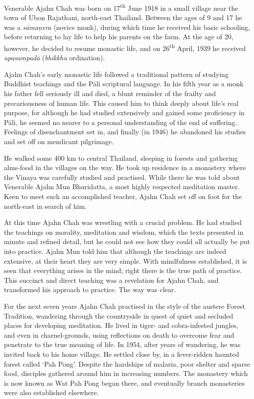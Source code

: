 
Venerable Ajahn Chah was born on 17\textsuperscript{th} June 1918 in a small village near
the town of Ubon Rajathani, north-east Thailand. Between the ages of 9
and 17 he was a \emph{sāmaṇera} (novice monk), during which time he
received his basic schooling, before returning to lay life to help his
parents on the farm. At the age of 20, however, he decided to resume
monastic life, and on 26\textsuperscript{th} April, 1939 he received \emph{upasampadā}
(\emph{bhikkhu} ordination).

Ajahn Chah's early monastic life followed a traditional pattern of
studying Buddhist teachings and the Pāli scriptural language. In his
fifth year as a monk his father fell seriously ill and died, a blunt reminder of
the frailty and precariousness of human life. This caused him to think
deeply about life's real purpose, for although he had studied
extensively and gained some proficiency in Pāli, he seemed no nearer to
a personal understanding of the end of suffering. Feelings of
disenchantment set in, and finally (in 1946) he abandoned his studies
and set off on mendicant pilgrimage. 

He walked some 400 km to central Thailand, sleeping in forests and
gathering alms-food in the villages on the way. He took up residence in a
monastery where the Vinaya was carefully studied and practised. While
there he was told about Venerable Ajahn Mun Bhuridatta, a most highly
respected meditation master. Keen to meet such an accomplished teacher, 
Ajahn Chah set off on foot for the north-east in search of him. 

At this time Ajahn Chah was wrestling with a crucial problem. He had
studied the teachings on morality, meditation and wisdom, which the
texts presented in minute and refined detail, but he could not see how
they could all actually be put into practice. Ajahn Mun told him that
although the teachings are indeed extensive, at their heart they are
very simple. With mindfulness established, it is seen that everything
arises in the mind; right there is the true path of practice. This
succinct and direct teaching was a revelation for Ajahn Chah, and
transformed his approach to practice. The way was clear. 

For the next seven years Ajahn Chah practised in the style of the
austere Forest Tradition, wandering through the countryside in quest of
quiet and secluded places for developing meditation. He lived in tiger-
and cobra-infested jungles, and even in charnel-grounds, using
reflections on death to overcome fear and penetrate to the true meaning
of life. In 1954, after years of wandering, he was invited back to his
home village. He settled close by, in a fever-ridden haunted forest
called `Pah Pong'. Despite the hardships of malaria, poor shelter and
sparse food, disciples gathered around him in increasing numbers. The
monastery which is now known as Wat Pah Pong began there, and eventually
branch monasteries were also established elsewhere. 

